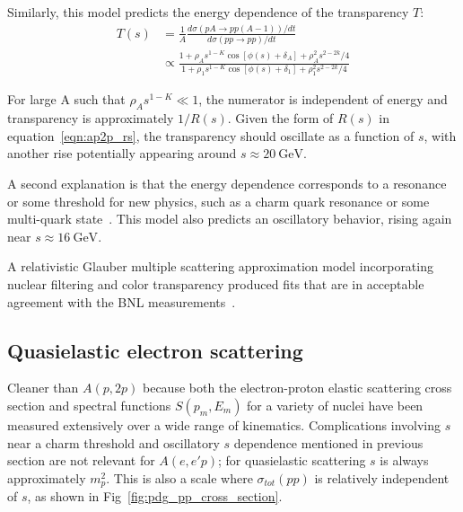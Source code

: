 Similarly, this model predicts the energy dependence of the transparency $T$:
\begin{align}
    T(s) &= \frac{1}{A}\frac{d\sigma\left(pA \rightarrow pp(A-1)\right)/dt}
                            {d\sigma\left(pp \rightarrow pp\right)/dt} \\
         &\propto \frac{1 + \rho_A s^{1-K} \cos\left[\phi(s)+\delta_A\right] + \rho_A^2 s^{2-2k}/4}
                       {1 + \rho_1 s^{1-K} \cos\left[\phi(s)+\delta_1\right] + \rho_1^2 s^{2-2k}/4}
\end{align}


For large A such that $\rho_As^{1-K}\ll1$, the numerator is independent of
energy and transparency is approximately $1/R(s)$.
Given the form of $R(s)$ in equation~\ref{eqn:ap2p_rs}, the transparency
should oscillate as a function of $s$, with another rise potentially
appearing around $s\approx\SI{20}{\giga\electronvolt}$.

A second explanation is that the energy dependence corresponds to a resonance
or some threshold for new physics, such as a charm quark resonance or some
multi-quark state~\cite{Brodsky_1988}. This model also predicts an oscillatory
behavior, rising again near $s\approx\SI{16}{\giga\electronvolt}$.

A relativistic Glauber multiple scattering approximation model
incorporating nuclear filtering and color transparency produced fits that are
in acceptable agreement with the BNL measurements~\cite{VanOvermeire_2007}.

\subsection{Quasielastic electron scattering}
Cleaner than $A(p,2p)$ because both the electron-proton elastic scattering cross section
and spectral functions $S(p_m,E_m)$ for a variety of nuclei
have been measured extensively over a wide range of kinematics.
Complications involving $s$ near a charm threshold and oscillatory $s$
dependence mentioned in previous section are not relevant for $A(e,e'p)$; for
quasielastic scattering $s$ is always approximately $m_p^2$.
This is also a scale where $\sigma_{tot}(pp)$ is relatively independent of $s$,
as shown in Fig~\ref{fig:pdg_pp_cross_section}.

